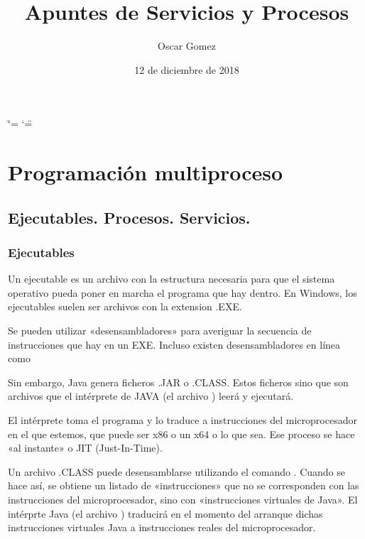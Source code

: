 \documentclass[letterpaper,10pt,spanish]{sphinxmanual}
\title{Apuntes de Servicios y Procesos}
\date{12 de diciembre de 2018}
\author{Oscar Gomez}
\begin{document}
\ifdefined\shorthandoff
  \ifnum\catcode`\=\string=\active\shorthandoff{=}\fi
  \ifnum\catcode`\"=\active{}\fi
\fi

\pagestyle{empty}
\maketitle
\pagestyle{plain}
\sphinxtableofcontents
\pagestyle{normal}
\label{\detokenize{index::doc}}



\chapter{Programación multiproceso}
\label{\detokenize{textos/tema1:programacion-multiproceso}}\label{\detokenize{textos/tema1::doc}}

\section{Ejecutables. Procesos. Servicios.}
\label{\detokenize{textos/tema1:ejecutables-procesos-servicios}}

\subsection{Ejecutables}
\label{\detokenize{textos/tema1:ejecutables}}
Un ejecutable es un archivo con la estructura necesaria para que el sistema operativo pueda poner en marcha el programa que hay dentro. En Windows, los ejecutables suelen ser archivos con la extension .EXE.

Se pueden utilizar «desensambladores» para averiguar la secuencia de instrucciones que hay en un EXE. Incluso existen desensambladores en línea como 

Sin embargo, Java genera ficheros .JAR o .CLASS. Estos ficheros  sino que son archivos que el intérprete de JAVA (el archivo ) leerá y ejecutará.

El intérprete toma el programa y lo traduce a instrucciones del microprocesador en el que estemos, que puede ser x86 o un x64 o lo que sea. Ese proceso se hace «al instante» o JIT (Just-In-Time).

Un archivo .CLASS puede desensamblarse utilizando el comando  . Cuando se hace así, se obtiene un listado de «instrucciones» que no se corresponden con las instrucciones del microprocesador, sino con «instrucciones virtuales de Java». El intérprte Java (el archivo ) traducirá en el momento del arranque dichas instrucciones virtuales Java a instrucciones reales del microprocesador.
\end{document}
